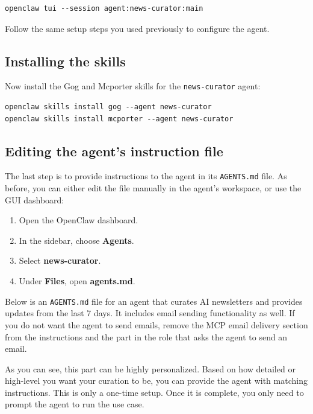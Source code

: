 \documentclass[12pt, a4paper]{article}
\begin{document}
\begin{lstlisting}[style=shellstyle]
openclaw tui --session agent:news-curator:main
\end{lstlisting}

Follow the same setup steps you used previously to configure the agent.

\subsection{Installing the skills}

Now install the Gog and Mcporter skills for the \texttt{news-curator} agent:

\begin{lstlisting}[style=shellstyle]
openclaw skills install gog --agent news-curator
openclaw skills install mcporter --agent news-curator
\end{lstlisting}

\subsection{Editing the agent's instruction file}

The last step is to provide instructions to the agent in its \texttt{AGENTS.md} file. As before, you can either edit the file manually in the agent's workspace, or use the GUI dashboard:

\begin{enumerate}[leftmargin=1.5em]
\item Open the OpenClaw dashboard.
\item In the sidebar, choose \textbf{Agents}.
\item Select \textbf{news-curator}.
\item Under \textbf{Files}, open \textbf{agents.md}.
\end{enumerate}

Below is an \texttt{AGENTS.md} file for an agent that curates AI newsletters and provides updates from the last 7 days. It includes email sending functionality as well. If you do not want the agent to send emails, remove the MCP email delivery section from the instructions and the part in the role that asks the agent to send an email.

\begin{notebox}
As you can see, this part can be highly personalized. Based on how detailed or high-level you want your curation to be, you can provide the agent with matching instructions. This is only a one-time setup. Once it is complete, you only need to prompt the agent to run the use case.
\end{notebox}
\end{document}

